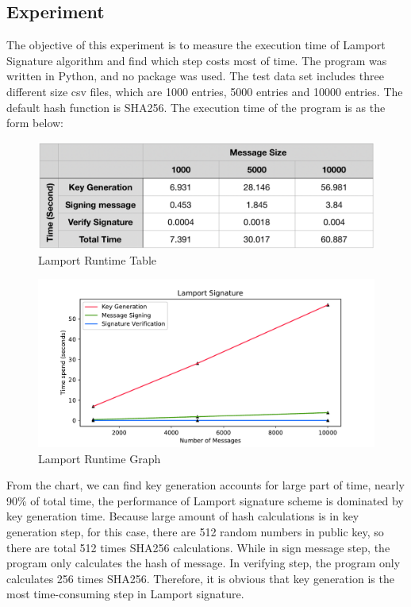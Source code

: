 \documentclass[10pt,sigconf]{acmart}
\begin{document}
\subsection{Experiment}

The objective of this experiment is to measure the execution time of Lamport Signature algorithm and find which step costs most of time. The program was written in Python, and no package was used. The test data set includes three different size csv files, which are 1000 entries, 5000 entries and 10000 entries. The default hash function is SHA256. The execution time of the program is as the form below:

\begin{figure}[H]
\centering
\includegraphics[scale=0.4]{Lamport_Runtime_Table.png}
\caption{\small{Lamport Runtime Table}}
\label{fig:Lamport_Runtime_Table}
\end{figure}

\begin{figure}[H]
\centering
\includegraphics[scale=0.45]{Lamport_Runtime_Graph}
\caption{\small{Lamport Runtime Graph}}
\label{fig:Lamport_Runtime_Graph}
\end{figure}

From the chart, we can find key generation accounts for large part of time, nearly 90\% of total time, the performance of Lamport signature scheme is dominated by key generation time. Because large amount of hash calculations is in key generation step, for this case, there are 512 random numbers in public key, so there are total 512 times SHA256 calculations. While in sign message step, the program only calculates the hash of message. In verifying step, the program only calculates 256 times SHA256. Therefore, it is obvious that key generation is the most time-consuming step in Lamport signature.
\end{document}
